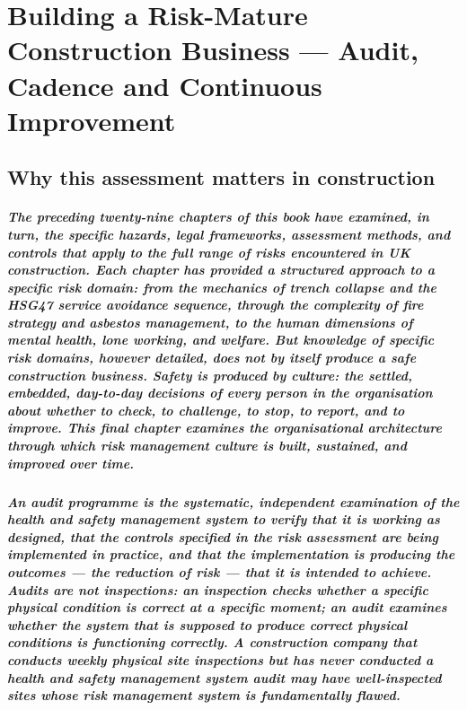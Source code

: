 \chapter{Building a Risk-Mature Construction Business --- Audit, Cadence and Continuous Improvement}
\label{chap:Building a Risk-Mature Construction Business --- Audit, Cadence and Continuous Improvement}

\section{Why this assessment matters in construction}

\paragraph{The preceding twenty-nine chapters of this book have examined, in turn, the specific hazards, legal frameworks, assessment methods, and controls that apply to the full range of risks encountered in UK construction. Each chapter has provided a structured approach to a specific risk domain: from the mechanics of trench collapse and the HSG47 service avoidance sequence, through the complexity of fire strategy and asbestos management, to the human dimensions of mental health, lone working, and welfare. But knowledge of specific risk domains, however detailed, does not by itself produce a safe construction business. Safety is produced by culture: the settled, embedded, day-to-day decisions of every person in the organisation about whether to check, to challenge, to stop, to report, and to improve. This final chapter examines the organisational architecture through which risk management culture is built, sustained, and improved over time.}

\paragraph{An audit programme is the systematic, independent examination of the health and safety management system to verify that it is working as designed, that the controls specified in the risk assessment are being implemented in practice, and that the implementation is producing the outcomes --- the reduction of risk --- that it is intended to achieve. Audits are not inspections: an inspection checks whether a specific physical condition is correct at a specific moment; an audit examines whether the system that is supposed to produce correct physical conditions is functioning correctly. A construction company that conducts weekly physical site inspections but has never conducted a health and safety management system audit may have well-inspected sites whose risk management system is fundamentally flawed.}

